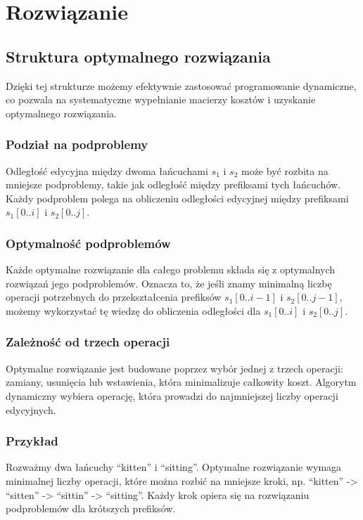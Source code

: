 \section{Rozwiązanie}
\subsection{Struktura optymalnego rozwiązania}
Dzięki tej strukturze możemy efektywnie zastosować programowanie dynamiczne, co pozwala na systematyczne wypełnianie macierzy kosztów i uzyskanie optymalnego rozwiązania.

\subsubsection{Podział na podproblemy}
Odległość edycyjna między dwoma łańcuchami \(s_1\) i \(s_2\) może być rozbita na mniejsze podproblemy, takie jak odległość między prefiksami tych łańcuchów. Każdy podproblem polega na obliczeniu odległości edycyjnej między prefiksami \(s_1[0..i]\) i \(s_2[0..j]\).

\subsubsection{Optymalność podproblemów}
Każde optymalne rozwiązanie dla całego problemu składa się z optymalnych rozwiązań jego podproblemów. Oznacza to, że jeśli znamy minimalną liczbę operacji potrzebnych do przekształcenia prefiksów \(s_1[0..i-1]\) i \(s_2[0..j-1]\), możemy wykorzystać tę wiedzę do obliczenia odległości dla \(s_1[0..i]\) i \(s_2[0..j]\).

\subsubsection{Zależność od trzech operacji}
Optymalne rozwiązanie jest budowane poprzez wybór jednej z trzech operacji: zamiany, usunięcia lub wstawienia, która minimalizuje całkowity koszt. Algorytm dynamiczny wybiera operację, która prowadzi do najmniejszej liczby operacji edycyjnych.

\subsubsection{Przykład}
Rozważmy dwa łańcuchy “kitten” i “sitting”. Optymalne rozwiązanie wymaga minimalnej liczby operacji, które można rozbić na mniejsze kroki, np. “kitten” -> “sitten” -> “sittin” -> “sitting”. Każdy krok opiera się na rozwiązaniu podproblemów dla krótszych prefiksów.

